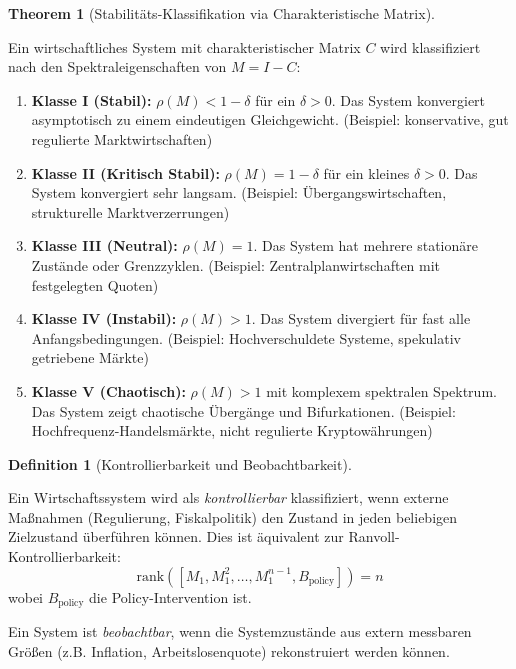 \documentclass[a4paper,12pt]{article}
\theoremstyle{definition}
\newtheorem{definition}{Definition}
\newtheorem{theorem}{Theorem}
\begin{document}
\begin{theorem}[Stabilitäts-Klassifikation via Charakteristische Matrix]
\label{thm:class_stabilitaet}

Ein wirtschaftliches System mit charakteristischer Matrix $C$ wird klassifiziert nach den Spektraleigenschaften von $M = I - C$:

\begin{enumerate}
\item \textbf{Klasse I (Stabil):} $\rho(M) < 1 - \delta$ für ein $\delta > 0$. Das System konvergiert asymptotisch zu einem eindeutigen Gleichgewicht. (Beispiel: konservative, gut regulierte Marktwirtschaften)

\item \textbf{Klasse II (Kritisch Stabil):} $\rho(M) = 1 - \delta$ für ein kleines $\delta > 0$. Das System konvergiert sehr langsam. (Beispiel: Übergangswirtschaften, strukturelle Marktverzerrungen)

\item \textbf{Klasse III (Neutral):} $\rho(M) = 1$. Das System hat mehrere stationäre Zustände oder Grenzzyklen. (Beispiel: Zentralplanwirtschaften mit festgelegten Quoten)

\item \textbf{Klasse IV (Instabil):} $\rho(M) > 1$. Das System divergiert für fast alle Anfangsbedingungen. (Beispiel: Hochverschuldete Systeme, spekulativ getriebene Märkte)

\item \textbf{Klasse V (Chaotisch):} $\rho(M) > 1$ mit komplexem spektralen Spektrum. Das System zeigt chaotische Übergänge und Bifurkationen. (Beispiel: Hochfrequenz-Handelsmärkte, nicht regulierte Kryptowährungen)
\end{enumerate}

\end{theorem}

\begin{definition}[Kontrollierbarkeit und Beobachtbarkeit]
\label{def:kontrollierbarkeit}

Ein Wirtschaftssystem wird als \emph{kontrollierbar} klassifiziert, wenn externe Maßnahmen (Regulierung, Fiskalpolitik) den Zustand in jeden beliebigen Zielzustand überführen können. Dies ist äquivalent zur Ranvoll-Kontrollierbarkeit:
\[
\mathrm{rank}([M_1, M_1^2, \ldots, M_1^{n-1}, B_{\text{policy}}]) = n
\]
wobei $B_{\text{policy}}$ die Policy-Intervention ist.

Ein System ist \emph{beobachtbar}, wenn die Systemzustände aus extern messbaren Größen (z.B. Inflation, Arbeitslosenquote) rekonstruiert werden können.
\end{definition}
\end{document}
